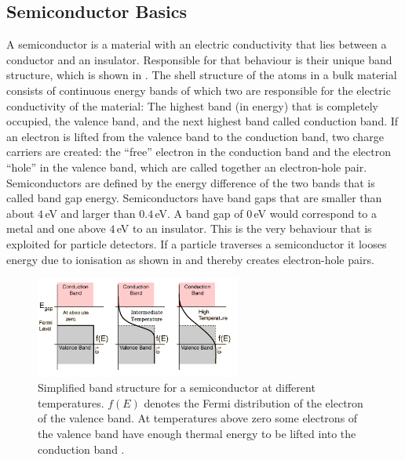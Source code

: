 \documentclass[british,11pt,a4paper]{memoir}
\begin{document}
\subsection{Semiconductor Basics}
A semiconductor is a material with an electric conductivity that lies between a conductor and an insulator. Responsible for that behaviour is their unique band structure, which is shown in . The shell structure of the atoms in a bulk material consists of continuous energy bands of which two are responsible for the electric conductivity of the material: The highest band (in energy) that is completely occupied, the valence band, and the next highest band called conduction band. If an electron is lifted from the valence band to the conduction band, two charge carriers are created: the ``free'' electron in the conduction band and the electron ``hole'' in the valence band, which are called together an electron-hole pair.\\
Semiconductors are defined by the energy difference of the two bands that is called band gap energy. Semiconductors have band gaps that are smaller than about $4\,$eV and larger than $0.4\,$eV. A band gap of $0\,$eV would correspond to a metal and one above $4\,$eV to an insulator. This is the very behaviour that is exploited for particle detectors. If a particle traverses a semiconductor it looses energy due to ionisation as shown in  and thereby creates electron-hole pairs.
\begin{figure}[ht]
	\centering
	\includegraphics[width=0.6\textwidth]{band}
	\caption{Simplified band structure for a semiconductor at different temperatures. $f(E)$ denotes the Fermi distribution of the electron of the valence band. At temperatures above zero some electrons of the valence band have enough thermal energy to be lifted into the conduction band \cite{hyperphys}.}
	\label{pband}
\end{figure}\no
\end{document}
